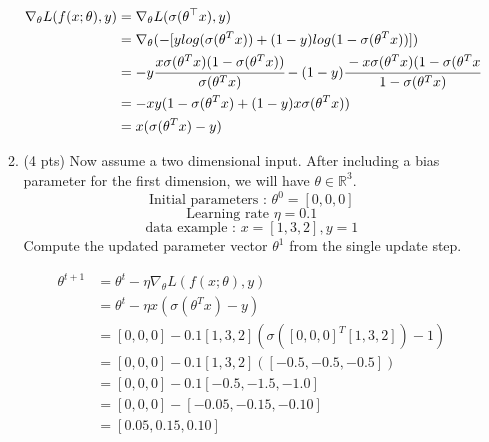 \documentclass[a4paper]{article}
\theoremstyle{definition}
\newenvironment{soln}{
    \leavevmode\color{blue}\ignorespaces
}{}
\begin{document}
\begin{enumerate}
\begin{enumerate}
	\begin{soln} 
        \begin{equation*}
        \begin{split}
        \nabla_{\theta} L(f(x;\theta), y) &= \nabla_{\theta} L(\sigma(\theta^\top x), y)\\
            &= \nabla_{\theta} (-[ylog(\sigma(\theta^{T}x)) + (1 - y)log(1-\sigma(\theta^{T}x))])\\
            &= -y\cfrac{x\sigma(\theta^{T}x)(1-\sigma(\theta^{T}x))}{\sigma(\theta^{T}x)} - (1-y)\cfrac{-x\sigma(\theta^{T}x)(1-\sigma(\theta^{T}x}{1-\sigma(\theta^{T}x)}\\
            &= -xy(1-\sigma(\theta^{T}x) + (1-y)x\sigma(\theta^{T}x)) \\
            &= x(\sigma(\theta^{T}x)-y)
        \end{split}
        \end{equation*}
        \end{soln}

        \newpage
	\item (4 pts)
 Now assume a two dimensional input. After including a bias parameter for the first dimension, we will have $\theta\in\mathbb{R}^3$.
$$ \text{Initial parameters : }  \theta^{0}=[0, 0, 0]$$
$$ \text{Learning rate }\eta=0.1$$
$$ \text{data example : } x=[1, 3, 2], y=1$$
Compute the updated parameter vector $\theta^{1}$ from the single update step.
	
	\begin{soln}
        \begin{equation*}
        \begin{split}
        \theta^{t+1} &= \theta^{t} - \eta \nabla_{\theta} L(f(x;\theta), y) \\
        & = \theta^{t} - \eta x(\sigma(\theta^{T}x)-y) \\
        &= [0, 0, 0] - 0.1[1, 3, 2](\sigma([0, 0, 0]^{T}[1, 3, 2]) - 1) \\
        &= [0, 0, 0] - 0.1[1, 3, 2]([-0.5, -0.5, -0.5]) \\
        &= [0, 0, 0] - 0.1[-0.5, -1.5, -1.0] \\
        &= [0, 0, 0] - [-0.05, -0.15, -0.10] \\
        &= [0.05, 0.15, 0.10]
        \end{split}
        \end{equation*}
        \end{soln}
\end{enumerate}
\end{enumerate}
\end{document}

